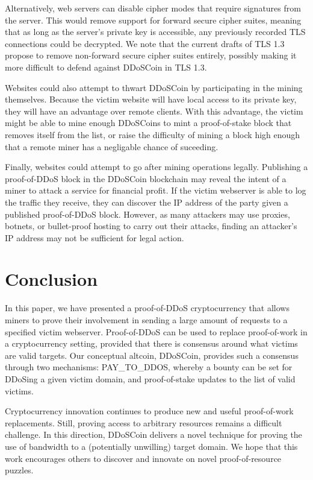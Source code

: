 Alternatively, web servers can disable cipher modes that require signatures from
the server. This would remove support for forward secure cipher suites, meaning
that as long as the server's private key is accessible, any previously recorded
TLS connections could be decrypted. We note that the current drafts of TLS 1.3
propose to remove non-forward secure cipher suites entirely, possibly making it
more difficult to defend against DDoSCoin in TLS 1.3.

Websites could also attempt to thwart DDoSCoin by participating in the mining
themselves. Because the victim website will have local access to its private
key, they will have an advantage over remote clients. With this advantage, the
victim might be able to mine enough DDoSCoins to mint a proof-of-stake block
that removes itself from the list, or raise the difficulty of mining a block
high enough that a remote miner has a negligable chance of suceeding.

Finally, websites could attempt to go after mining operations legally.
Publishing a proof-of-DDoS block in the DDoSCoin blockchain may reveal the
intent of a miner to attack a service for financial profit. If the victim webserver is able to
log the traffic they receive, they can discover the IP address of the party
given a published proof-of-DDoS block. However, as many attackers may use proxies,
botnets, or bullet-proof hosting to carry out their attacks, finding an
attacker's IP address may not be sufficient for legal action.


\section{Conclusion}

In this paper, we have presented a proof-of-DDoS cryptocurrency that allows
miners to prove their involvement in sending a large amount of requests to a
specified victim webserver. Proof-of-DDoS can be used to replace proof-of-work
in a cryptocurrency setting, provided that there is consensus around what
victims are valid targets. Our conceptual altcoin, DDoSCoin, provides such a
consensus through two mechanisms: PAY\_TO\_DDOS, whereby a bounty can be set for
DDoSing a given victim domain, and proof-of-stake updates to the list of valid
victims.

Cryptocurrency innovation continues to produce new and useful proof-of-work
replacements. Still, proving access to arbitrary resources remains a difficult
challenge. In this direction, DDoSCoin delivers a novel technique for proving
the use of bandwidth to a (potentially unwilling) target domain. We hope that
this work encourages others to discover and innovate on novel proof-of-resource
puzzles.

{\footnotesize\balance

}


